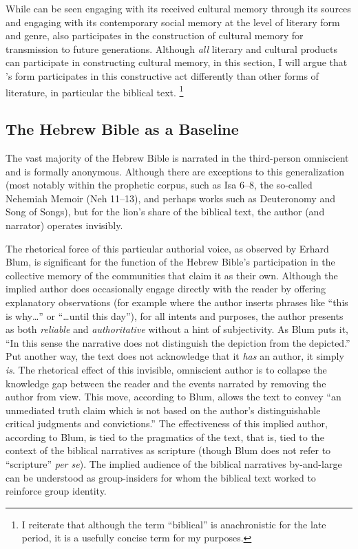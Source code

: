 While \ga can be seen engaging with its received cultural memory through its sources and engaging with its contemporary social memory at the level of literary form and genre, \ga also participates in the construction of cultural memory for transmission to future generations. Although \emph{all} literary and cultural products can participate in constructing cultural memory, in this section, I will argue that \ga's \psgraphic form participates in this constructive act differently than other forms of literature, in particular the biblical text.%
    \footnote{I reiterate that although the term ``biblical'' is anachronistic for the late \secondtemple period, it is a usefully concise term for my purposes.}

\subsection{The Hebrew Bible as a Baseline}

The vast majority of the Hebrew Bible is narrated in the third-person omniscient and is formally anonymous. Although there are exceptions to this generalization (most notably within the prophetic corpus, such as Isa 6--8, the so-called Nehemiah Memoir (Neh 11--13), and perhaps works such as Deuteronomy and Song of Songs), but for the lion's share of the biblical text, the author (and narrator) operates invisibly.

The rhetorical force of this particular authorial voice, as observed by Erhard Blum, is significant for the function of the Hebrew Bible's participation in the collective memory of the communities that claim it as their own. Although the implied author does occasionally engage directly with the reader by offering explanatory observations (for example where the author inserts phrases like ``this is why\ldots{}'' or ``\ldots{}until this day''), for all intents and purposes, the author presents as both \emph{reliable} and \emph{authoritative} without a hint of subjectivity. As Blum puts it, ``In this sense the narrative does not distinguish the depiction from the depicted.''%
    \autocite[33]{blum_barton-etal2007}
Put another way, the text does not acknowledge that it \emph{has} an author, it simply \emph{is}. The rhetorical effect of this invisible, omniscient author is to collapse the knowledge gap between the reader and the events narrated by removing the author from view. This move, according to Blum, allows the text to convey ``an unmediated truth claim which is not based on the author's distinguishable critical judgments and convictions.''%
    \autocite[33]{blum_barton-etal2007}
The effectiveness of this implied author, according to Blum, is tied to the pragmatics of the text, that is, tied to the context of the biblical narratives as scripture (though Blum does not refer to ``scripture'' \emph{per se}). The implied audience of the biblical narratives by-and-large can be understood as group-insiders for whom the biblical text worked to reinforce group identity.

